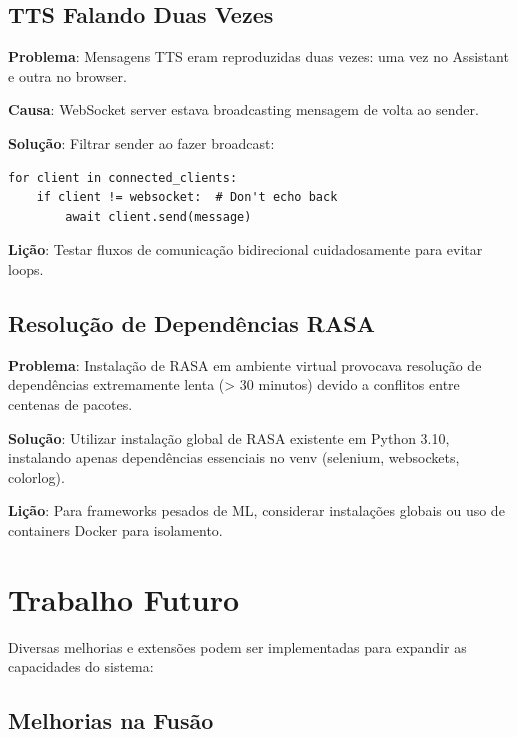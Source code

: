 \subsection{TTS Falando Duas Vezes}

\textbf{Problema}: Mensagens TTS eram reproduzidas duas vezes: uma vez no Assistant e outra no browser.

\textbf{Causa}: WebSocket server estava broadcasting mensagem de volta ao sender.

\textbf{Solução}: Filtrar sender ao fazer broadcast:
\begin{verbatim}
for client in connected_clients:
    if client != websocket:  # Don't echo back
        await client.send(message)
\end{verbatim}

\textbf{Lição}: Testar fluxos de comunicação bidirecional cuidadosamente para evitar loops.

\subsection{Resolução de Dependências RASA}

\textbf{Problema}: Instalação de RASA em ambiente virtual provocava resolução de dependências extremamente lenta (> 30 minutos) devido a conflitos entre centenas de pacotes.

\textbf{Solução}: Utilizar instalação global de RASA existente em Python 3.10, instalando apenas dependências essenciais no venv (selenium, websockets, colorlog).

\textbf{Lição}: Para frameworks pesados de ML, considerar instalações globais ou uso de containers Docker para isolamento.

\section{Trabalho Futuro}

Diversas melhorias e extensões podem ser implementadas para expandir as capacidades do sistema:

\subsection{Melhorias na Fusão}

